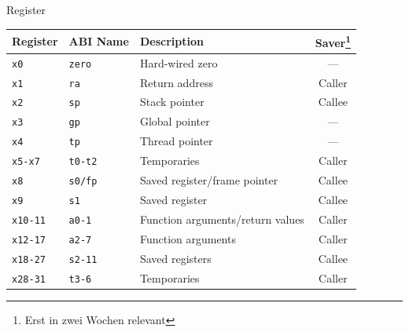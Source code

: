 \documentclass[
  german,            %
  aspectratio=169,    %
]{tumbeamer}
\begin{document}
\begin{frame}[c]{Register}{}
	\begin{center}
		{\rmfamily
			\begin{tabular}{|l|l|l|c|}
				\hline
				Register        & ABI Name       & Description                      & Saver\footnote{Erst in zwei Wochen relevant} \\ \hline
				\texttt{x0}     & \texttt{zero}  & Hard-wired zero                  & ---                                          \\
				\rowcolor{altblue}
				\texttt{x1}     & \texttt{ra}    & Return address                   & Caller                                       \\
				\texttt{x2}     & \texttt{sp}    & Stack pointer                    & Callee                                       \\
				\texttt{x3}     & \texttt{gp}    & Global pointer                   & ---                                          \\
				\texttt{x4}     & \texttt{tp}    & Thread pointer                   & ---                                          \\
				\texttt{x5-x7}  & \texttt{t0-t2} & Temporaries                      & Caller                                       \\
				\texttt{x8}     & \texttt{s0/fp} & Saved register/frame pointer     & Callee                                       \\
				\texttt{x9}     & \texttt{s1}    & Saved register                   & Callee                                       \\
				\rowcolor{altyellow}
				\texttt{x10-11} & \texttt{a0-1}  & Function arguments/return values & Caller                                       \\
				\texttt{x12-17} & \texttt{a2-7}  & Function arguments               & Caller                                       \\
				\rowcolor{altmagenta}
				\texttt{x18-27} & \texttt{s2-11} & Saved registers                  & Callee                                       \\
				\rowcolor{altgreen}
				\texttt{x28-31} & \texttt{t3-6}  & Temporaries                      & Caller                                       \\ \hline
			\end{tabular}
		}
	\end{center}
\end{frame}
\end{document}
